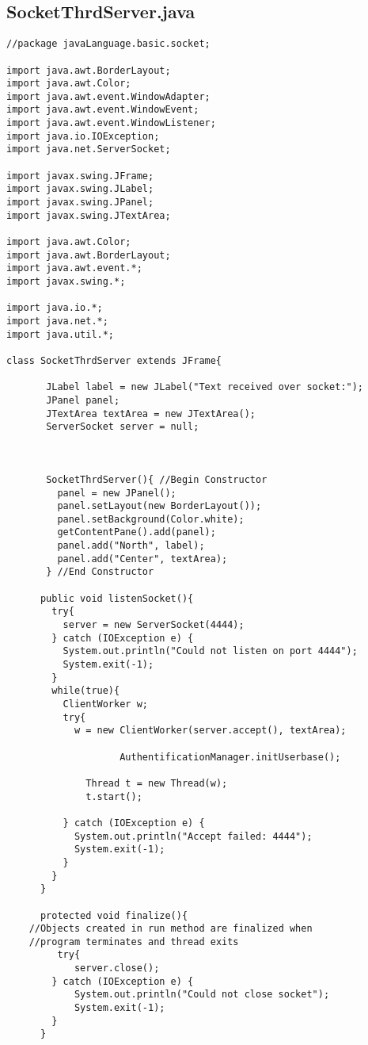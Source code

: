\documentclass[12pt]{article}
\theoremstyle{plain}
\begin{document}
\subsection{SocketThrdServer.java}
\begin{lstlisting}
//package javaLanguage.basic.socket;

import java.awt.BorderLayout;
import java.awt.Color;
import java.awt.event.WindowAdapter;
import java.awt.event.WindowEvent;
import java.awt.event.WindowListener;
import java.io.IOException;
import java.net.ServerSocket;

import javax.swing.JFrame;
import javax.swing.JLabel;
import javax.swing.JPanel;
import javax.swing.JTextArea;

import java.awt.Color;
import java.awt.BorderLayout;
import java.awt.event.*;
import javax.swing.*;

import java.io.*;
import java.net.*;
import java.util.*;

class SocketThrdServer extends JFrame{

	   JLabel label = new JLabel("Text received over socket:");
	   JPanel panel;
	   JTextArea textArea = new JTextArea();
	   ServerSocket server = null;



	   SocketThrdServer(){ //Begin Constructor
	     panel = new JPanel();
	     panel.setLayout(new BorderLayout());
	     panel.setBackground(Color.white);
	     getContentPane().add(panel);
	     panel.add("North", label);
	     panel.add("Center", textArea);
	   } //End Constructor

	  public void listenSocket(){
	    try{
	      server = new ServerSocket(4444);
	    } catch (IOException e) {
	      System.out.println("Could not listen on port 4444");
	      System.exit(-1);
	    }
	    while(true){
	      ClientWorker w;
	      try{
	        w = new ClientWorker(server.accept(), textArea);

					AuthentificationManager.initUserbase();

		      Thread t = new Thread(w);
		      t.start();

	      } catch (IOException e) {
	        System.out.println("Accept failed: 4444");
	        System.exit(-1);
	      }
	    }
	  }

	  protected void finalize(){
	//Objects created in run method are finalized when
	//program terminates and thread exits
	     try{
	        server.close();
	    } catch (IOException e) {
	        System.out.println("Could not close socket");
	        System.exit(-1);
	    }
	  }


\end{lstlisting}
\end{document}

